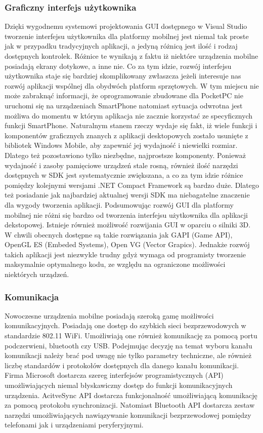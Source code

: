 \subsubsection{Graficzny interfejs użytkownika}
Dzięki wygodnemu systemowi projektowania GUI dostępnego w Visual Studio tworzenie
interfejsu użytkownika dla platformy mobilnej jest niemal tak proste jak w
przypadku tradycyjnych aplikacji, a jedyną różnicą jest ilość i rodzaj dostępnych
kontrolek. Różnice te wynikają z faktu iż niektóre urządzenia mobilne posiadają
ekrany dotykowe, a inne nie. Co za tym idzie, rozwój interfejsu użytkownika staje
się bardziej skomplikowany zwłaszcza jeżeli interesuje nas rozwój aplikacji
wspólnej dla obydwóch platform sprzętowych. W tym miejscu nie może zabraknąć
informacji, że oprogramowanie zbudowane dla PocketPC nie uruchomi się na
urządzeniach SmartPhone natomiast sytuacja odwrotna jest możliwa do momentu w
którym aplikacja nie zacznie korzystać ze specyficznych funkcji SmartPhone.
Naturalnym stanem rzeczy wydaje się fakt, iż wiele funkcji i komponentów
graficznych znanych z aplikacji desktopowych zostało usunięte z bibliotek
Windows Mobile, aby zapewnić jej wydajność i niewielki rozmiar. Dlatego też
pozostawiono tylko niezbędne, najprostsze komponenty. Ponieważ wydajność  i
zasoby pamięciowe urządzeń stale rosną, również ilość narzędzi dostępnych w SDK
jest systematycznie zwiększana, a co za tym idzie różnice pomiędzy kolejnymi
wersjami .NET Compact Framework są bardzo duże. Dlatego też posiadanie jak
najbardziej aktualnej wersji SDK ma niebagatelne znaczenie dla wygody tworzenia
aplikacji. Podsumowując rozwój GUI dla platformy mobilnej nie różni się bardzo
od tworzenia interfejsu użytkownika dla aplikacji dekstopowej. Istnieje również
możliwość rozwijania GUI w oparciu o silniki 3D. W chwili obecnych dostępne są
takie rozwiązania jak GAPI (Game API), OpenGL ES (Embeded Systems), Open VG
(Vector Grapics). Jednakże rozwój takich aplikacji jest niezwykle trudny gdyż
wymaga od programisty tworzenie maksymalnie optymalnego kodu, ze względu na
ograniczone możliwości niektórych urządzeń. 

\subsubsection{Komunikacja}
Nowoczesne urządzenia mobilne posiadają szeroką gamę możliwości komunikacyjnych.
Posiadają one dostęp do szybkich sieci bezprzewodowych w standardzie 802.11
WiFi. Umożliwiają one również komunikację za pomocą portu podczerwieni,
bluetooth czy USB. Podejmując decyzję na temat wyboru kanału komunikacji należy
brać pod uwagę nie tylko parametry techniczne, ale również liczbę standardów i
protokołów dostępnych dla danego kanału komunikacji. Firma Microsoft dostarcza
szereg interfejsów programistycznych (API) umożliwiających niemal błyskawiczny
dostęp do funkcji komunikacyjnych urządzenia. AcitveSync API dostarcza funkcjonalność
umożliwiającą komunikację za pomocą protokołu synchronizacji. Natomiast
Bluetooth API dostarcza zestaw narzędzi umożliwiających nawiązywanie komunikacji
bezprzewodowej pomiędzy telefonami jak i urządzeniami peryferyjnymi.  

